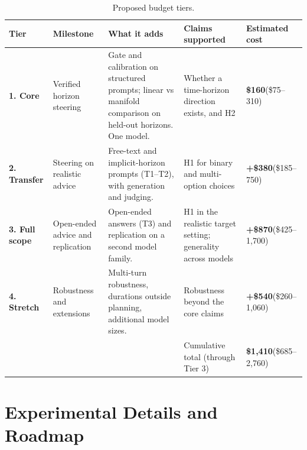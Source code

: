 \documentclass[midterm]{sparreport}
\begin{document}
\begin{table}[htbp]
  \centering
  \caption{Proposed budget tiers.}
  \label{tab:budget}
  \small
  \begin{tabular}{L{0.75in}L{0.95in}L{1.7in}L{1.25in}L{0.9in}}
    \toprule
    \textbf{Tier} & \textbf{Milestone} & \textbf{What it adds} & \textbf{Claims supported} & \textbf{Estimated cost} \\
    \midrule
    \textbf{1. Core} & Verified horizon steering & Gate and calibration on structured prompts; linear vs manifold comparison on held-out horizons. One model. & Whether a time-horizon direction exists, and H2 & \textbf{\$160}\newline(\$75--310) \\
    \addlinespace
    \textbf{2. Transfer} & Steering on realistic advice & Free-text and implicit-horizon prompts (T1--T2), with generation and judging. & H1 for binary and multi-option choices & \textbf{+\$380}\newline(\$185--750) \\
    \addlinespace
    \textbf{3. Full scope} & Open-ended advice and replication & Open-ended answers (T3) and replication on a second model family. & H1 in the realistic target setting; generality across models & \textbf{+\$870}\newline(\$425--1,700) \\
    \addlinespace
    \textbf{4. Stretch} & Robustness and extensions & Multi-turn robustness, durations outside planning, additional model sizes. & Robustness beyond the core claims & \textbf{+\$540}\newline(\$260--1,060) \\
    \midrule
    & & & Cumulative total (through Tier 3) & \textbf{\$1,410}\newline(\$685--2,760) \\
    \bottomrule
  \end{tabular}
\end{table}




\appendix

\section{Experimental Details and Roadmap}
\label{app:details}
\end{document}
